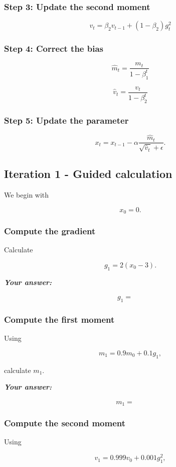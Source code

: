 \documentclass{course_sheet}
\begin{document}
\subsubsection*{Step 3: Update the second moment}
\[
v_t = \beta_2v_{t-1} + (1-\beta_2)g_t^2
\]

\subsubsection*{Step 4: Correct the bias}
\[
\hat m_t = \frac{m_t}{1-\beta_1^t}
\]

\[
\hat v_t = \frac{v_t}{1-\beta_2^t}
\]

\subsubsection*{Step 5: Update the parameter}
\[
x_t =
x_{t-1}
-
\alpha
\frac{\hat m_t}
{\sqrt{\hat v_t}+\epsilon}.
\]

\clearpage
\subsection*{Iteration 1 - Guided calculation}
We begin with

\[
x_0=0.
\]

\subsubsection*{Compute the gradient}
Calculate

\[
g_1 = 2(x_0-3).
\]

\textbf{\textit{Your answer:}}

\[
g_1 = {\phantom{000}}
\]

\subsubsection*{Compute the first moment}
Using

\[
m_1 = 0.9m_0 + 0.1g_1,
\]

calculate $m_1$.

\textbf{\textit{Your answer:}}

\[
m_1 = {\phantom{000}}
\]

\subsubsection*{Compute the second moment}
Using

\[
v_1 = 0.999v_0 + 0.001g_1^2,
\]
\end{document}
